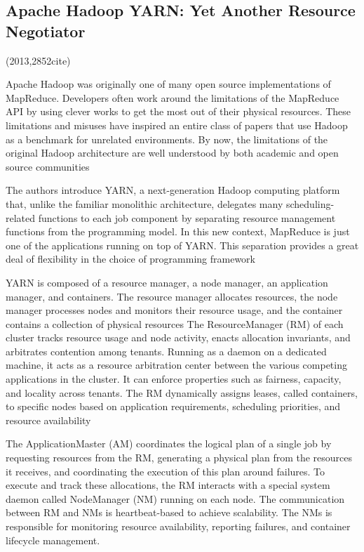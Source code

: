 \documentclass[a4paper,twoside]{scrbook}
\begin{document}
\subsection{Apache Hadoop YARN: Yet Another Resource Negotiator \cite{vavilapalli2013apache}}
(2013,2852cite)\par
Apache Hadoop was originally one of many open source implementations of MapReduce. Developers often work around the limitations of the MapReduce API by using clever works to get the most out of their physical resources.
These limitations and misuses have inspired an entire class of papers that use Hadoop as a benchmark for unrelated environments. By now, the limitations of the original Hadoop architecture are well understood by both academic and open source communities
\par
The authors introduce YARN, a next-generation Hadoop computing platform that, unlike the familiar monolithic architecture, delegates many scheduling-related functions to each job component by separating resource management functions from the programming model. In this new context, MapReduce is just one of the applications running on top of YARN. This separation provides a great deal of flexibility in the choice of programming framework
\par
YARN is composed of a resource manager, a node manager, an application manager, and containers. The resource manager allocates resources, the node manager processes nodes and monitors their resource usage, and the container contains a collection of physical resources
The ResourceManager (RM) of each cluster tracks resource usage and node activity, enacts allocation invariants, and arbitrates contention among tenants. Running as a daemon on a dedicated machine, it acts as a resource arbitration center between the various competing applications in the cluster. It can enforce properties such as fairness, capacity, and locality across tenants. The RM dynamically assigns leases, called containers, to specific nodes based on application requirements, scheduling priorities, and resource availability
\par
The ApplicationMaster (AM) coordinates the logical plan of a single job by requesting resources from the RM, generating a physical plan from the resources it receives, and coordinating the execution of this plan around failures.
To execute and track these allocations, the RM interacts with a special system daemon called NodeManager (NM) running on each node. The communication between RM and NMs is heartbeat-based to achieve scalability. The NMs is responsible for monitoring resource availability, reporting failures, and container lifecycle management.
\end{document}
